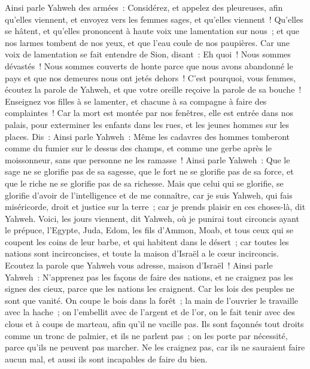 \begin{multicols}{2}
Ainsi parle Yahweh des armées~: Considérez, et appelez des pleureuses, afin qu'elles viennent, et envoyez vers les femmes sages, et qu'elles viennent~!
Qu'elles se hâtent, et qu'elles prononcent à haute voix une lamentation sur nous~; et que nos larmes tombent de nos yeux, et que l'eau coule de nos paupières.
Car une voix de lamentation se fait entendre de Sion, disant~: Eh quoi~! Nous sommes dévastés~! Nous sommes couverts de honte parce que nous avons abandonné le pays et que nos demeures nous ont jetés dehors~!
C'est pourquoi, vous femmes, écoutez la parole de Yahweh, et que votre oreille reçoive la parole de sa bouche~! Enseignez vos filles à se lamenter, et chacune à sa compagne à faire des complaintes~!
Car la mort est montée par nos fenêtres, elle est entrée dans nos palais, pour exterminer les enfants dans les rues, et les jeunes hommes sur les places.
Dis~: Ainsi parle Yahweh~: Même les cadavres des hommes tomberont comme du fumier sur le dessus des champs, et comme une gerbe après le moissonneur, sans que personne ne les ramasse~!
Ainsi parle Yahweh~: Que le sage ne se glorifie pas de sa sagesse, que le fort ne se glorifie pas de sa force, et que le riche ne se glorifie pas de sa richesse.
Mais que celui qui se glorifie, se glorifie d'avoir de l'intelligence et de me connaître, car je suis Yahweh, qui fais miséricorde, droit et justice sur la terre~; car je prends plaisir en ces choses-là, dit Yahweh.
Voici, les jours viennent, dit Yahweh, où je punirai tout circoncis ayant le prépuce,
l'Egypte, Juda, Edom, les fils d'Ammon, Moab, et tous ceux qui se coupent les coins de leur barbe, et qui habitent dans le désert~; car toutes les nations sont incirconcises, et toute la maison d'Israël a le cœur incirconcis.
\VerseOne{}Ecoutez la parole que Yahweh vous adresse, maison d'Israël~!
Ainsi parle Yahweh~: N'apprenez pas les façons de faire des nations, et ne craignez pas les signes des cieux, parce que les nations les craignent.
Car les lois des peuples ne sont que vanité. On coupe le bois dans la forêt~; la main de l'ouvrier le travaille avec la hache~;
on l'embellit avec de l'argent et de l'or, on le fait tenir avec des clous et à coups de marteau, afin qu'il ne vacille pas.
Ils sont façonnés tout droits comme un tronc de palmier, et ils ne parlent pas~; on les porte par nécessité, parce qu'ils ne peuvent pas marcher. Ne les craignez pas, car ils ne sauraient faire aucun mal, et aussi ils sont incapables de faire du bien.

\end{multicols}
